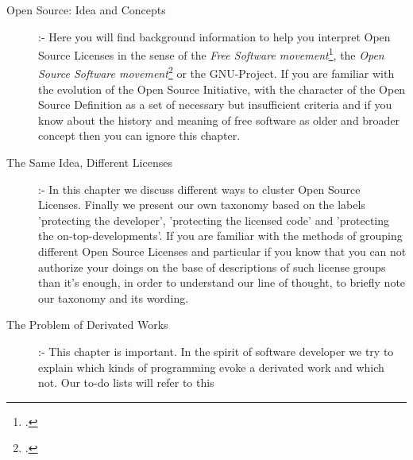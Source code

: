 \begin{description}
  \item[Open Source: Idea and Concepts] :- Here you will find background
  information to help you interpret Open Source Licenses in the sense of the
  \emph{Free Software movement}\footcite[At least at this place you are perhaps
  expecting that we use the logograms FLOSS, F/OSS, F/LOSS, or whatever. As you
  will read later on the word \textit{Free} is ambiguous and has strained the
  use of the concept \textit{Free Software}. Later on we will also talk about
  the invention of the concept \textit{Open Source} designed as a 'replacement'
  and acting as a 'splitter'. The mentioned logograms are introduced to
  re-establish or - at least - to underline the common history and the common
  center of 'both' movements, whereby the word \textit{Libre} shall resolve the
  abiguity of the word \textit{Free}. For a first survey cf.] [\nopage
  wp.]{wpFloss2011a}, the \emph{Open Source Software movement}\footcite[For
  another brief and informative introduction cf.][231ff esp. p.
  232f.]{Fogel2006a} or the GNU-Project. If
  you are familiar with the evolution of the Open Source Initiative, with the
  character of the Open Source Definition as a set of necessary but insufficient
  criteria and if you know about the history and meaning of free software as
  older and broader concept then you can ignore this chapter.
  \item[The Same Idea, Different Licenses] :- In this chapter we discuss
  different ways to cluster Open Source Licenses. Finally we present our own
  taxonomy based on the labels 'protecting the developer', 'protecting the
  licensed code' and 'protecting the on-top-developments'. If you are familiar
  with the methods of grouping different Open Source Licenses and particular
  if you know that you can not authorize your doings on the base of descriptions
  of such license groups than it's enough, in order to understand our line of
  thought, to briefly note our taxonomy and its wording.
  \item[The Problem of Derivated Works] :- This chapter is important. In the
  spirit of software developer we try to explain which kinds of programming
  evoke a derivated work and which not. Our to-do lists will refer to this

\end{description}

